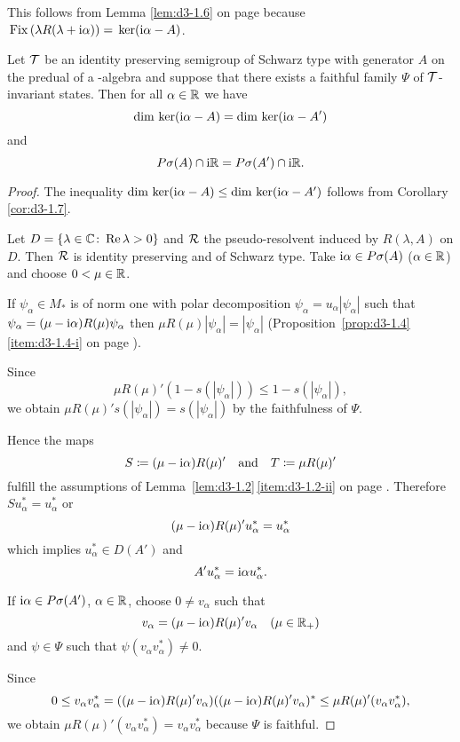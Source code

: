 This follows from Lemma \ref{lem:d3-1.6} on page \pageref{lem:d3-1.6} because $\mathop{}\mathrm{Fix}\left(\lambda R(\lambda+\mathrm{i}\alpha)\right) = \mathop{}\mathrm{ker}(\mathrm{i}\alpha-A)$.
\begin{proposition}\label{prop:d3-1.8}
Let $\mathcal{T}$ be an identity preserving semigroup of Schwarz type with generator $A$ on the predual of a \WA-algebra and suppose that there exists a faithful family $\Psi$ of $\mathcal{T}$-invariant states.
Then for all $\alpha \in \mathbb{R}$ we have
\[
\dim \mathop{}\mathrm{ker}(\mathrm{i}\alpha - A) = \dim \mathop{}\mathrm{ker}(\mathrm{i}\alpha - A')
\]
and
\[
P\sigma(A) \cap \mathrm{i}\mathbb{R} = P{\sigma}(A') \cap \mathrm{i}\mathbb{R} .
\]
\end{proposition}
\begin{proof}
The inequality $\dim \mathop{}\mathrm{ker}(\mathrm{i}\alpha - A) \leq \dim \mathop{}\mathrm{ker}(\mathrm{i}\alpha - A')$ follows from Corollary \ref{cor:d3-1.7}.

Let $D = \{\lambda \in \mathbb{C} \colon \mathop{}\!\mathrm{Re}\,\lambda > 0\}$ and $\mathcal{R}$ the pseudo-resolvent induced by $R(\lambda,A)$ on $D$.
Then $\mathcal{R}$ is identity preserving and of Schwarz type.
Take $\mathrm{i}\alpha \in P\sigma(A)$ ($\alpha \in \mathbb{R}$) and choose $0 < \mu \in \mathbb{R}$.

If $\psi_{\alpha} \in M_{*}$ is of norm one with polar decomposition $\psi_{\alpha} = u_{\alpha}|\psi_{\alpha}|$ such that $\psi_{\alpha} = (\mu - \mathrm{i}\alpha)R(\mu)\psi_{\alpha}$ then $\mu R(\mu)|\psi_{\alpha}| = |\psi_{\alpha}|$ (Proposition~\ref{prop:d3-1.4}\,\ref{item:d3-1.4-i} on page \pageref{prop:d3-1.4}).

Since
\[
\mu R(\mu)'(1 - s(|\psi_{\alpha}|)) \leq 1 - s(|\psi_{\alpha}|) ,
\]
we obtain $\mu R(\mu)'s(|\psi_{\alpha}|) = s(|\psi_{\alpha}|)$ by the faithfulness of $\Psi$.

Hence the maps 
\[
S \coloneqq (\mu - \mathrm{i}\alpha)R(\mu)'  
\quad \text{and} \quad 
T \coloneqq \mu R(\mu)'
\]
fulfill the assumptions of Lemma~\ref{lem:d3-1.2}\,\ref{item:d3-1.2-ii} on page \pageref{lem:d3-1.2}.
Therefore $Su_{\alpha}^{*} = u_{\alpha}^{*}$ or 
\[
(\mu-\mathrm{i}\alpha)R(\mu)'u_{\alpha}^{*} = u_{\alpha}^{*}
\]
which implies $u_{\alpha}^{*} \in D(A')$ and 
\[
A'u_{\alpha}^{*} = \mathrm{i}\alpha u_{\alpha}^{*}.
\]

If $\mathrm{i}\alpha \in P{\sigma}(A')$, $\alpha \in \mathbb{R}$, choose $0 \neq v_{\alpha}$ such that
\[
v_{\alpha} = (\mu - \mathrm{i}\alpha)R(\mu)'v_{\alpha} \quad (\mu \in \mathbb{R}_{+})
\]
and $\psi \in \Psi$ such that $\psi(v_{\alpha}v_{\alpha}^{*}) \neq 0$.

Since
\[
0 \leq v_{\alpha}v_{\alpha}^{*} = ((\mu - \mathrm{i}\alpha)R(\mu)'v_{\alpha})((\mu - \mathrm{i}\alpha)R(\mu)'v_{\alpha})^{*} \leq \mu R(\mu)'(v_{\alpha}v_{\alpha}^{*}) ,
\]
we obtain $\mu R(\mu)'(v_{\alpha}v_{\alpha}^{*}) = v_{\alpha}v_{\alpha}^{*}$ because $\Psi$ is faithful.


\end{proof}
